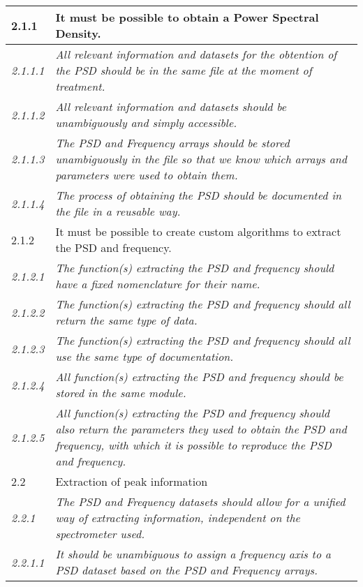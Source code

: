 \begin{tabular}{|p{1cm}|p{14cm}|}
    \hline
    \rowcolor{graysuperlight} 2.1.1 &  It must be possible to obtain a Power Spectral Density. \\ \hline
    \textit{2.1.1.1} & \textit{All relevant information and datasets for the obtention of the PSD should be in the same file at the moment of treatment.} \\ \hline
    \textit{2.1.1.2} & \textit{All relevant information and datasets should be unambiguously and simply accessible.} \\ \hline
    \textit{2.1.1.3} & \textit{The PSD and Frequency arrays should be stored unambiguously in the file so that we know which arrays and parameters were used to obtain them.} \\ \hline
    \textit{2.1.1.4} & \textit{The process of obtaining the PSD should be documented in the file in a reusable way.} \\ \hline
    \rowcolor{graysuperlight} 2.1.2 &  It must be possible to create custom algorithms to extract the PSD and frequency. \\ \hline
    \textit{2.1.2.1} & \textit{The function(s) extracting the PSD and frequency should have a fixed nomenclature for their name.} \\ \hline
    \textit{2.1.2.2} & \textit{The function(s) extracting the PSD and frequency should all return the same type of data.} \\ \hline
    \textit{2.1.2.3} & \textit{The function(s) extracting the PSD and frequency should all use the same type of documentation.} \\ \hline
    \textit{2.1.2.4} & \textit{All function(s) extracting the PSD and frequency should be stored in the same module.} \\ \hline
    \textit{2.1.2.5} & \textit{All function(s) extracting the PSD and frequency should also return the parameters they used to obtain the PSD and frequency, with which it is possible to reproduce the PSD and frequency.} \\ \hline

    \rowcolor{graylight} 2.2 & Extraction of peak information \\ \hline
    \rowcolor{graysuperlight}\textit{2.2.1} & \textit{The PSD and Frequency datasets should allow for a unified way of extracting information, independent on the spectrometer used.} \\ \hline
    \textit{2.2.1.1} & \textit{It should be unambiguous to assign a frequency axis to a PSD dataset based on the PSD and Frequency arrays.} \\ \hline


\end{tabular}

